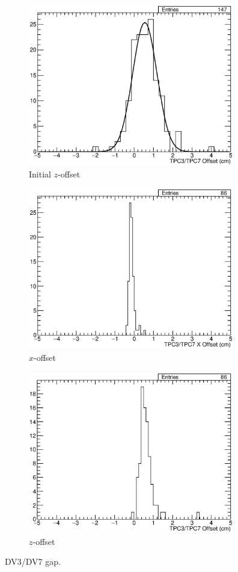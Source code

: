 \begin{figure}
  \centering
  \begin{subfigure}[t]{\linewidth}
    \centering
    \includegraphics[width=9cm]{TPC3TPC7Gap.eps}
    \caption{Initial $z$-offset}
    \label{fig:AppendixTPC3TPC7Gap}
  \end{subfigure}
  \vfill
  \begin{subfigure}[t]{\linewidth}
    \centering
    \includegraphics[width=9cm]{TPC3TPC7XOff.eps}
    \caption{$x$-offset}
    \label{fig:AppendixTPC3TPC7XOff}
  \end{subfigure}
  \vfill
  \begin{subfigure}[t]{\linewidth}
    \centering
    \includegraphics[width=9cm]{TPC3TPC7ZOff.eps}
    \caption{$z$-offset}
    \label{fig:AppendixTPC3TPC7ZOff}
  \end{subfigure}
  \caption{DV3/DV7 gap.}
  \label{fig:AppendixTPC3TPC7}
\end{figure}


